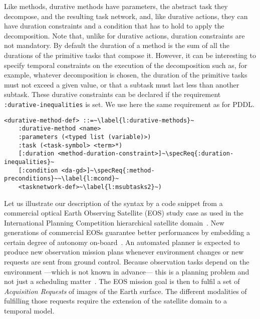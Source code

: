\documentclass[letterpaper]{article} %
\begin{document}
%
%
Like methods, durative methods have parameters, the abstract task they decompose, and the resulting task network, and, like durative actions, they can have duration constraints and a condition that has to hold to apply the decomposition. Note that, unlike for durative actions, duration constraints are not mandatory. By default the duration of a method is the sum of all the durations of the primitive tasks that compose it. However, it can be interesting to specify temporal constraints on the execution of the decomposition such as, for example, whatever decomposition is chosen, the duration of the primitive tasks must not exceed a given value, or that a subtask must last less than another subtask. These durative constraints can be declared if the requirement {\tt :durative-inequalities} is set. We use here the same requirement as for PDDL.

\begin{lstlisting}[firstnumber=last, escapechar=~]
<durative-method-def> ::=~\label{l:durative-methods}~
    :durative-method <name>
    :parameters (<typed list (variable)>)
    :task (<task-symbol> <term>*)
    [:duration <method-duration-constraint>]~\specReq{:duration-inequalities}~
    [:condition <da-gd>]~\specReq{:method-preconditions}~~\label{l:mcond}~
    <tasknetwork-def>~\label{l:msubtasks2}~)
\end{lstlisting}


Let us illustrate our description of the syntax by a code snippet from a commercial optical Earth Observing Satellite (EOS) study case as used in the International Planning Competition hierarchical satellite domain~\citep{schattenberg2020}. New generations of commercial EOSs guarantee better performances by embedding a certain degree of autonomy on-board~\citep{pralet2019}. An automated planner is expected to produce new observation mission plans whenever environment changes or new requests are sent from ground control. Because observation tasks depend on the environment ---which is not known in advance--- this is a planning problem and not just a scheduling matter~\citep{rodriguez-moreno2004}.
%
The EOS mission goal is then to fulfil a set of \emph{Acquisition Requests} of images of the Earth surface.
The different modalities of fulfilling those requests require the extension of the satellite domain to a temporal model.
\end{document}
